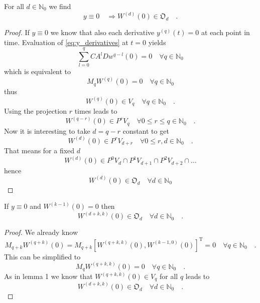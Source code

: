 \begin{lemma}{}{}
	For all $d\in\mathbb{N}_0$ we find
	\begin{equation}
	y\equiv 0 \quad \Rightarrow W^{(d)}(0) \in \mathfrak{O}_d \quad .
	\end{equation}
\end{lemma}
\begin{proof}
	If $y\equiv 0$ we know that also each derivative $y^{(q)}(t)=0$ at each point in time. 
	Evaluation of \eqref{eq:y_derivatives} at $t=0$ yields
	\begin{equation}
	\sum\limits_{l=0}^q CA^lD w^{q-l}(0) = 0\quad \forall q\in\mathbb{N}_0
	\end{equation}
	which is equivalent to
	\begin{equation}
	M_q W^{(q)}(0) = 0 \quad \forall q\in\mathbb{N}_0
	\end{equation}
	thus 
	\begin{equation}
	W^{(q)}(0) \in V_q \quad \forall q\in\mathbb{N}_0 \quad .
	\end{equation}
	Using the projection $r$ times leads to
	\begin{equation}
	W^{(q-r)}(0) \in P^r V_q \quad \forall 0\leq r \leq q \in \mathbb{N}_0 \quad .
	\end{equation}
	Now it is interesting to take $d=q-r$ constant to get
	\begin{equation}
	W^{(d)}(0) \in P^r V_{d+r} \quad \forall 0\leq r , d\in\mathbb{N}_0 \quad .
	\end{equation}
	That means for a fixed $d$ 
	\begin{equation}
	W^{(d)}(0) \in P^0 V_d \cap P^1 V_{d+1} \cap P^2 V_{d+2} \cap \ldots
	\end{equation}
	hence
	\begin{equation}
	W^{(d)}(0) \in \mathfrak{O}_d \quad \forall d\in\mathbb{N}_0
	\end{equation}
\end{proof}

\begin{lemma}{}{}
	If $y\equiv 0$ and $W^{(k-1)}(0)=0$ then
	\begin{equation}
	W^{(d+k,k)} (0) \in \mathfrak{O}_d \quad \forall d \in \mathbb{N}_0  \quad .  
	\end{equation}
\end{lemma}
\begin{proof}
	We already know
	\begin{equation}
	M_{q+k}W^{(q+k)}(0) = M_{q+k} \left[ W^{(q+k,k)}(0),W^{(k-1,0)}(0) \right]^\text{T} = 0
	\quad \forall q\in\mathbb{N}_0 \quad .
	\end{equation}
	This can be simplified to
	\begin{equation}
	M_q W^{(q+k,k)}(0)=0  \quad \forall q\in\mathbb{N}_0 \quad .
	\end{equation}
	As in lemma 1 we know that $W^{(q+k,k)}(0)\in V_q$ for all $q$ leads to
	\begin{equation}
	W^{(d+k,k)}(0) \in \mathfrak{O}_d \quad \forall d\in\mathbb{N}_0 \quad .
	\end{equation}
\end{proof}

